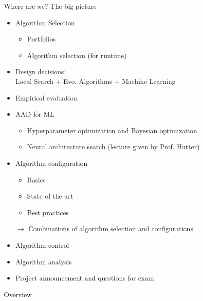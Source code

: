 \begin{frame}[c]{Where are we? The big picture}

\begin{itemize}
\item Algorithm Selection
  \begin{itemize}
    \item Portfolios
    \item Algorithm selection (for runtime)
  \end{itemize}
  \item Design decisions:\\ Local Search + Evo. Algorithms + Machine Learning 
  \item Empirical evaluation
  \item AAD for ML
  \begin{itemize}
    \item Hyperparameter optimization and Bayesian optimization 
    \item Neural architecture search (lecture given by Prof. Hutter)
  \end{itemize}
  \item Algorithm configuration 
  \begin{itemize}
    \item Basics 
    \item State of the art 
    \item Best practices 
  \end{itemize}
  \item[$\to$] Combinations of algorithm selection and configurations
  \item Algorithm control 
  \item Algorithm analysis 
  \item Project announcement and questions for exam 
\end{itemize}

\end{frame}
\begin{frame}[c]{Overview}

\centering
\scalebox{0.8}{

}

\end{frame}
